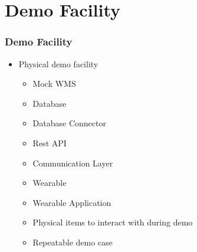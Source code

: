 \section{Demo Facility}
\begin{frame}\frametitle{Demo Facility}
	\begin{itemize}
		\item Physical demo facility
		\begin{itemize}
			\item Mock WMS
			\item Database
			\item Database Connector
			\item Rest API
			\item Communication Layer
			\item Wearable
			\item Wearable Application
			\item Physical items to interact with during demo
			\item Repeatable demo case
		\end{itemize}
	\end{itemize}
\end{frame}